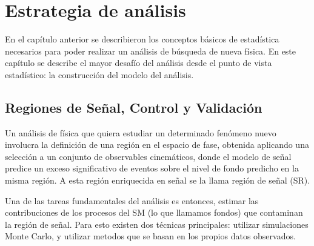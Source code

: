 \chapter{Estrategia de análisis}

En el capítulo anterior se describieron los conceptos básicos de estadística
necesarios para poder realizar un análisis de búsqueda de nueva física. En este
capítulo se describe el mayor desafío del análisis desde el punto de vista
estadístico: la construcción del modelo del análisis.


\section{Regiones de Señal, Control y Validación}

Un análisis de física que quiera estudiar un determinado fenómeno nuevo
involucra la definición de una región en el espacio de fase, obtenida aplicando
una selección a un conjunto de observables cinemáticos, donde el modelo de señal
predice un exceso significativo de eventos sobre el nivel de fondo predicho en
la misma región. A esta región enriquecida en señal se la llama región de señal
(SR).

Una de las tareas fundamentales del análisis es entonces, estimar las
contribuciones de los procesos del SM (lo que llamamos fondos) que contaminan la región de
señal.
Para esto existen dos técnicas principales: utilizar simulaciones Monte Carlo, y
utilizar metodos que se basan en los propios datos observados.



